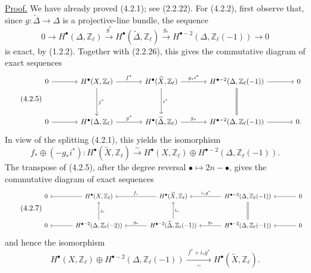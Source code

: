 \underline{Proof.}
We have already proved (4.2.1); see (2.2.22).  For (4.2.2), first observe
that, since $g:\widetilde\Delta\to\Delta$ is a projective-line bundle, the
sequence
\begin{equation}\tag{4.2.4}
0\longrightarrow H^\bullet(\Delta,\mathbb Z_\ell)
\xrightarrow{g^*}H^\bullet(\widetilde\Delta,\mathbb Z_\ell)
\xrightarrow{g_*}H^{\bullet-2}(\Delta,\mathbb Z_\ell(-1))
\longrightarrow0
\end{equation}
is exact, by (1.2.2).  Together with (2.2.26), this gives the commutative
diagram of exact sequences
\begin{equation}\tag{4.2.5}
\resizebox{\textwidth}{!}{%
\begin{tikzcd}[ampersand replacement=\&,column sep=large,row sep=huge]
0\arrow[r]
  \&H^\bullet(X,\mathbb Z_\ell)
       \arrow[r,"f^*"]\arrow[d,"j^*" right]
  \&H^\bullet(\widetilde X,\mathbb Z_\ell)
       \arrow[r,"g_*i^*"]\arrow[d,"i^*" right]
  \&H^{\bullet-2}(\Delta,\mathbb Z_\ell(-1))
       \arrow[r]\arrow[d,equal]
  \&0\\
0\arrow[r]
  \&H^\bullet(\Delta,\mathbb Z_\ell)
       \arrow[r,"g^*"]
  \&H^\bullet(\widetilde\Delta,\mathbb Z_\ell)
       \arrow[r,"g_*"]
  \&H^{\bullet-2}(\Delta,\mathbb Z_\ell(-1))
       \arrow[r]
  \&0.
\end{tikzcd}}
\end{equation}
In view of the splitting (4.2.1), this yields the isomorphism
\begin{equation}\tag{4.2.6}
f_*\oplus(-g_*i^*):
H^\bullet(\widetilde X,\mathbb Z_\ell)
\xrightarrow{\sim}
H^\bullet(X,\mathbb Z_\ell)\oplus
H^{\bullet-2}(\Delta,\mathbb Z_\ell(-1)).
\end{equation}
The transpose of (4.2.5), after the degree reversal
$\bullet\mapsto2n-\bullet$, gives the commutative diagram of exact sequences
\begin{equation}\tag{4.2.7}
\resizebox{\textwidth}{!}{%
\begin{tikzcd}[ampersand replacement=\&,column sep=large,row sep=large]
0
  \&H^\bullet(X,\mathbb Z_\ell)\arrow[l]
  \&H^\bullet(\widetilde X,\mathbb Z_\ell)\arrow[l,"f_*"']
  \&H^{\bullet-2}(\Delta,\mathbb Z_\ell(-1))
       \arrow[l,"i_*g^*"']
  \&0\arrow[l]\\
0
  \&H^{\bullet-2}(\Delta,\mathbb Z_\ell(-2))
       \arrow[l]\arrow[u,"j_*"']
  \&H^{\bullet-2}(\widetilde\Delta,\mathbb Z_\ell(-1))
       \arrow[l,"g_*"']\arrow[u,"i_*"']
  \&H^{\bullet-2}(\Delta,\mathbb Z_\ell(-1))
       \arrow[l,"g_*"']\arrow[u,equal]
  \&0\arrow[l]
\end{tikzcd}}
\end{equation}
and hence the isomorphism
\begin{equation}\tag{4.2.8}
H^\bullet(X,\mathbb Z_\ell)\oplus
H^{\bullet-2}(\Delta,\mathbb Z_\ell(-1))
\xrightarrow[\sim]{\ f^*+i_*g^*\ }
H^\bullet(\widetilde X,\mathbb Z_\ell).
\end{equation}
